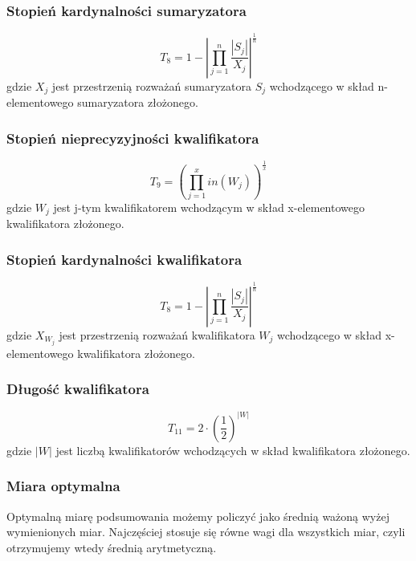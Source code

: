 \documentclass{classrep}
\begin{document}
\subsubsection{Stopień kardynalności sumaryzatora}
\begin{equation}
T_8=1-|\prod_{j=1}^n\frac{|S_j|}{X_j}|^{\frac{1}{n}}
\end{equation}
gdzie $X_j$ jest przestrzenią rozważań sumaryzatora $S_j$ wchodzącego w skład n-elementowego sumaryzatora złożonego.

\subsubsection{Stopień nieprecyzyjności kwalifikatora}
\begin{equation}
T_9=(\prod_{j=1}^x in(W_j))^{\frac{1}{x}}
\end{equation}
gdzie $W_j$ jest j-tym kwalifikatorem wchodzącym w skład x-elementowego kwalifikatora złożonego.  

\subsubsection{Stopień kardynalności kwalifikatora}
\begin{equation}
T_8=1-|\prod_{j=1}^n\frac{|S_j|}{X_j}|^{\frac{1}{n}}
\end{equation}
gdzie $X_{W_j}$ jest przestrzenią rozważań kwalifikatora $W_j$ wchodzącego w skład x-elementowego kwalifikatora złożonego.

\subsubsection{Długość kwalifikatora}
\begin{equation}
T_11=2 \cdot (\frac{1}{2})^{|W|}
\end{equation}
gdzie $|W|$ jest liczbą kwalifikatorów wchodzących w skład kwalifikatora złożonego.

\subsubsection{Miara optymalna}
Optymalną miarę podsumowania możemy policzyć jako średnią ważoną wyżej wymienionych miar. Najczęściej stosuje się równe wagi dla wszystkich miar, czyli otrzymujemy wtedy średnią arytmetyczną.
\end{document}
